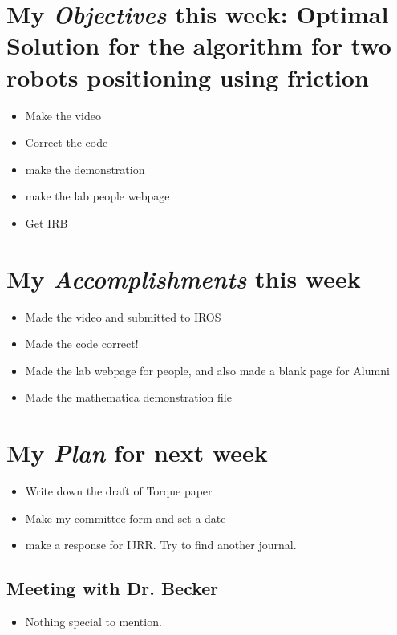 \newcommand{\handoutName}{Weekly report}
\newcommand{\handoutdate}{\today}


\section{My \emph{Objectives} this week: Optimal Solution for the algorithm for two robots positioning using friction}
\begin{itemize}
\item Make the video
\item Correct the code
\item make the demonstration
\item make the lab people webpage
\item Get IRB
\end{itemize}



\section{My \emph{Accomplishments} this week}


\begin{itemize}
\item Made the video and submitted to IROS
\item Made the code correct!
\item Made the lab webpage for people, and also made a blank page for Alumni
\item Made the mathematica demonstration file
\end{itemize}


\section{My \emph{Plan} for next week}

\begin{itemize}
\item Write down the draft of Torque paper
\item Make my committee form and set a date
\item make a response for IJRR. Try to find another journal.
\end{itemize}

\subsection{Meeting with Dr. Becker  }

\begin{itemize}
\item Nothing special to mention.
\end{itemize}


